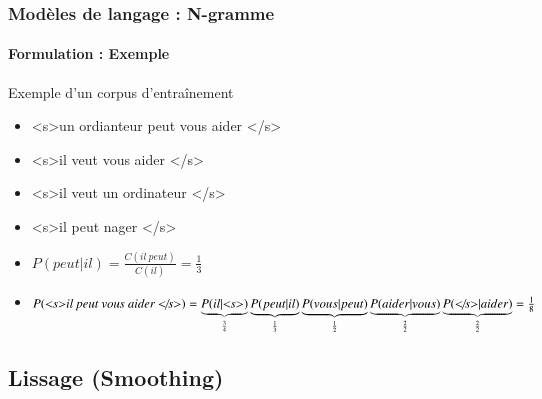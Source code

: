 \documentclass[xcolor=table]{beamer}
\begin{document}
\begin{frame}
\frametitle{Modèles de langage : N-gramme}
\framesubtitle{Formulation : Exemple}

\begin{exampleblock}{Exemple d'un corpus d'entraînement}
	\begin{itemize}
		\item \textless s\textgreater un ordianteur peut vous aider \textless/s\textgreater
		\item \textless s\textgreater il veut vous aider \textless/s\textgreater
		\item \textless s\textgreater il veut un ordinateur \textless/s\textgreater
		\item \textless s\textgreater il peut nager \textless/s\textgreater
	\end{itemize}
\end{exampleblock}

\begin{itemize}
	\item $P(peut | il) = \frac{C(il\ peut)}{C(il)} = \frac{1}{3}$
	\item $P(\text{\textit{\textless s\textgreater il peut vous aider \textless/s\textgreater}}) = 
	\underbrace{P(il|\text{\textit{\textless s\textgreater}})}_{\frac{3}{4}}
	\underbrace{P(peut|il)}_{\frac{1}{3}} 
	\underbrace{P(vous|peut)}_{\frac{1}{2}} 
	\underbrace{P(aider|vous)}_{\frac{2}{2}}
	\underbrace{P(\text{\textit{\textless/s\textgreater}}|aider)}_{\frac{2}{2}} = 
	\frac{1}{8}
	$
\end{itemize}


\end{frame}

\subsection{Lissage (Smoothing)}
\end{document}
